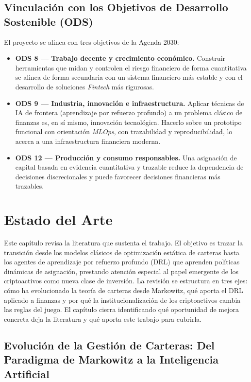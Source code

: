 \documentclass[IB,a4paper]{TFUOC}
\begin{document}
\section{Vinculación con los Objetivos de Desarrollo Sostenible (ODS)}
El proyecto se alinea con tres objetivos de la Agenda 2030:
\begin{itemize}
    \item \textbf{ODS 8 — Trabajo decente y crecimiento económico.} Construir herramientas que midan y controlen el riesgo financiero de forma cuantitativa se alinea de forma secundaria con un sistema financiero más estable y con el desarrollo de soluciones \textit{Fintech} más rigurosas.
    \item \textbf{ODS 9 — Industria, innovación e infraestructura.} Aplicar técnicas de IA de frontera (aprendizaje por refuerzo profundo) a un problema clásico de finanzas es, en sí mismo, innovación tecnológica. Hacerlo sobre un prototipo funcional con orientación \textit{MLOps}, con trazabilidad y reproducibilidad, lo acerca a una infraestructura financiera moderna.
    \item \textbf{ODS 12 — Producción y consumo responsables.} Una asignación de capital basada en evidencia cuantitativa y trazable reduce la dependencia de decisiones discrecionales y puede favorecer decisiones financieras más trazables.
\end{itemize}


\chapter{Estado del Arte}
\label{cap:estado_del_arte}

Este capítulo revisa la literatura que sustenta el trabajo. El objetivo es trazar la transición desde los modelos clásicos de optimización estática de carteras hasta los agentes de aprendizaje por refuerzo profundo (DRL) que aprenden políticas dinámicas de asignación, prestando atención especial al papel emergente de los criptoactivos como nueva clase de inversión. La revisión se estructura en tres ejes: cómo ha evolucionado la teoría de carteras desde Markowitz, qué aporta el DRL aplicado a finanzas y por qué la institucionalización de los criptoactivos cambia las reglas del juego. El capítulo cierra identificando qué oportunidad de mejora concreta deja la literatura y qué aporta este trabajo para cubrirla.

\section{Evolución de la Gestión de Carteras: Del Paradigma de Markowitz a la Inteligencia Artificial}
\end{document}
